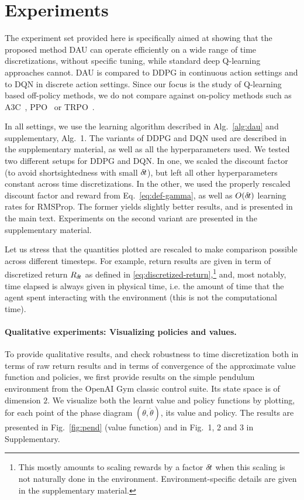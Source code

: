 \section{Experiments}
\label{sec:exp}

The experiment set provided here is specifically aimed at showing that
the proposed method DAU can operate efficiently on a wide range of time
discretizations, without specific tuning, while standard deep Q-learning
approaches cannot. DAU is compared to DDPG in continuous action settings and to DQN in
discrete action settings.
Since our focus is the study of Q-learning based off-policy methods, we do not
compare against on-policy methods such as A3C~\cite{a3c}, PPO~\cite{ppo} or
TRPO~\cite{trpo}.

In all settings, we use the learning algorithm described in
Alg.~\ref{alg:dau} and supplementary, Alg.~1. The variants of DDPG and DQN
used are described in the supplementary material, as well as all the hyperparameters
used. We tested two different setups for DDPG and DQN.
In one, we scaled the discount factor (to avoid shortsightedness with small ${\delta\hspace{-.1em}t}$), but
left all other hyperparameters constant across time discretizations.
In the other, we used the properly rescaled discount
factor and reward from Eq.~\eqref{eq:def-gamma},
as well as $O({\delta\hspace{-.1em}t})$ learning rates for RMSProp.  The former yields slightly
better results, and is presented in the main text. Experiments on the second
variant are presented in the
supplementary material.

Let us stress that the quantities plotted are rescaled to make comparison
possible across different timesteps. For example,
return results are given in term of discretized return $R_{\delta\hspace{-.1em}t}$ as defined in \eqref{eq:discretized-return},\footnote{This mostly amounts to scaling rewards
by a factor ${\delta\hspace{-.1em}t}$ when this scaling is not naturally done in the environment. Environment-specific
details are given in the supplementary material.} and, most notably, time elapsed is always given in
physical time, i.e. the amount of time that the agent spent interacting with the environment (this is not the computational time).


\paragraph{Qualitative experiments: Visualizing policies and values.}
To provide qualitative results, and check robustness to time
discretization both in terms of raw return results and in terms
of convergence of the approximate value function and policies, we first provide results on the simple pendulum environment
from the OpenAI Gym classic control suite.  Its state space is of
dimension $2$. We visualize both the learnt value and policy functions by
plotting, for each point of the phase diagram $(\theta, \dot{\theta})$,
its value and policy. The results are presented in
Fig.~\ref{fig:pend} (value function) and in Fig.~1, 2 and 3 in
Supplementary.

